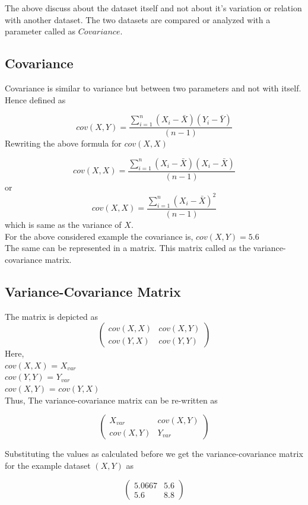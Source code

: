 \documentclass[a4paper]{article}
\begin{document}
The above discuss about the dataset itself and not about it's variation or relation with another dataset. The two datasets are compared or analyzed with a parameter called as $Covariance.$
\subsection{Covariance}
Covariance is similar to variance but between two parameters and not with itself. Hence defined as

$$cov(X,Y)={\frac{ \sum_ {i=1}^n {(X_i-\bar{X})}{(Y_i-\bar{Y})}}{(n-1)}}$$
\parskip 0pt 
Rewriting the above formula for $cov(X,X)$ 

$$cov(X,X)={\frac{ \sum_ {i=1}^n {(X_i-\bar{X})}{(X_i-\bar{X})}}{(n-1)}}$$
\parskip 0pt 
or
$$cov(X,X)={\frac{ \sum_ {i=1}^n {(X_i-\bar{X})^2}}{(n-1)}}$$
\parskip 0pt 
which is same as the variance of $X$.\\

For the above considered example the covariance is, $cov(X,Y) = 5.6$\\
The same can be represented in a matrix. This matrix called as the variance-covariance matrix.

\subsection{Variance-Covariance Matrix}

The matrix is depicted as\\

$$\begin{pmatrix} cov(X,X) & cov(X,Y) \\  cov(Y,X) & cov(Y,Y) \end{pmatrix}$$
\parskip 0pt 
Here,\\
\parskip 0pt
$cov(X,X)$ = $X_{var}$\\
\parskip 0pt 
$cov(Y,Y)$ = $Y_{var}$\\
\parskip 0pt 
$cov(X,Y)$ = $cov(Y,X)$\\
\parskip 0pt 
Thus, The variance-covariance matrix can be re-written as

$$\begin{pmatrix} X_{var} & cov(X,Y) \\  cov(X,Y) & Y_{var} \end{pmatrix}$$

Substituting the values as calculated before we get the variance-covariance matrix for the example dataset $(X,Y)$ as

$$\begin{pmatrix} 5.0667 & 5.6 \\  5.6 & 8.8  \end{pmatrix}$$
\end{document}
